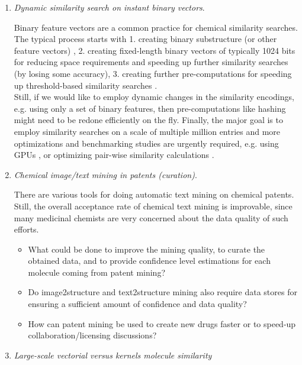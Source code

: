 \documentclass{sig-alternate}
\begin{document}
\begin{enumerate}
\item \emph{Dynamic similarity search on instant binary vectors}.

  Binary feature vectors are a common practice for chemical similarity
  searches. The typical process starts with 1. creating binary
  substructure (or other feature vectors) \cite{citeulike:8530538},
  2. creating fixed-length binary vectors of typically 1024 bits for
  reducing space requirements and speeding up further similarity
  searches (by losing some accuracy), 3. creating further
  pre-computations for speeding up threshold-based similarity searches
  \cite{doi:10.1021/ci800076s}.\\  Still, if we would like to employ
  dynamic changes in the similarity encodings, e.g. using only a set
  of binary features, then pre-computations like hashing
  might need to be redone efficiently on the fly. Finally, the major
  goal is to employ similarity searches \cite{doi:10.1021/ci200235e}
  on a scale of multiple million entries and more optimizations and
  benchmarking studies are urgently required, e.g. using GPUs
  \cite{doi:10.1021/ci1004948}, or optimizing pair-wise similarity
  calculations \cite{MINF:MINF201100050}.
%

\item \emph{Chemical image/text mining in patents (curation)}.

  There are various tools for doing automatic text mining on chemical
  patents. Still, the overall acceptance rate of chemical text mining
  is improvable, since many medicinal chemists are very concerned
  about the data quality of such efforts.\cite{chemicalEntityRecognition,textMiningForDrugs}

  \begin{itemize}
  \item What could be done to improve the mining quality, to curate the
    obtained data, and to provide confidence level estimations for
    each molecule coming from patent mining?
  \item Do image2structure and text2structure mining also require data
    stores for ensuring a sufficient amount of confidence and data
    quality?
  \item How can patent mining be used to create new drugs faster or to
    speed-up collaboration/licensing discussions?
 \end{itemize}

\item \emph{Large-scale vectorial versus kernels molecule similarity}


\end{enumerate}
\end{document}
